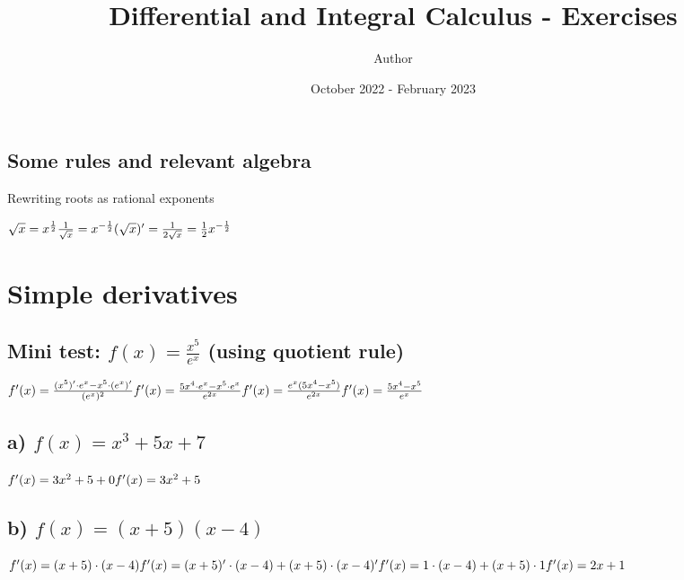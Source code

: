 \documentclass{article}
\title{Differential and Integral Calculus - Exercises}
\author{Author}
\date{October 2022 - February 2023}
\begin{document}
\maketitle

\subsection{Some rules and relevant algebra}
Rewriting roots as rational exponents

$
\\
\sqrt{x} = x^{\frac{1}{2}}
\\
\\
\frac{1}{\sqrt{x}} = x^{-\frac{1}{2}}
\\
\\
(\sqrt{x})' = \frac{1}{2\sqrt{x}} = \frac{1}{2}x^{-\frac{1}{2}}
$

\pagebreak

\section{Simple derivatives}

\subsection{Mini test: $f(x) = \frac{x^5}{e^x}$ (using quotient rule)}
$
  f'(x) = \frac{(x^5)' \cdot e^x - x^5 \cdot (e^x)'}{(e^x)^2}
  \\
  \\
  f'(x) = \frac{5x^4 \cdot e^x - x^5 \cdot e^x}{e^{2x}}
  \\
  \\
  f'(x) = \frac{e^x (5x^4 - x^5)}{e^{2x}}
  \\
  \\
  f'(x) = \frac{5x^4 - x^5}{e^x}
$

\subsection{a) $f(x) = x^3 + 5x + 7$}
$
f'(x) = 3x^2 + 5 + 0
\\
\\
f'(x) = 3x^2 + 5
$

\subsection{b) $f(x) = (x+5)(x-4)$}
$
f'(x) = (x+5) \cdot (x-4)
\\
\\
f'(x) = (x+5)' \cdot (x-4) + (x+5) \cdot (x-4)'
\\
\\
f'(x) = 1 \cdot (x-4) + (x+5) \cdot 1
\\
\\
f'(x) = 2x + 1
$
\end{document}
